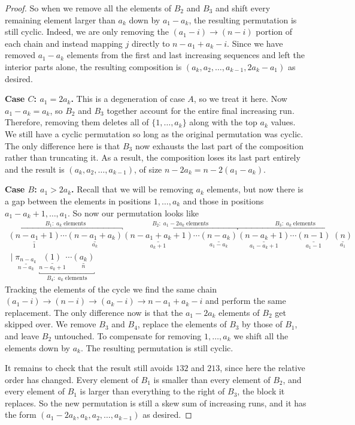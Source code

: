 \documentclass[10pt,a4paper]{amsart}
\begin{document}
\begin{proof}
    So when we remove all the elements of $B_2$ and $B_3$ and shift every remaining element larger than $a_k$ down by $a_1-a_k$, the resulting permutation is still cyclic. Indeed, we are only removing the $(a_1 - i) \to (n-i)$ portion of each chain and instead mapping $j$ directly to $n-a_1 + a_k - i$. Since we have removed $a_1-a_k$ elements from the first and last increasing sequences and left the interior parts alone, the resulting composition is $(a_k,a_2,\dots,a_{k-1},2a_k-a_1)$ as desired.

    \medskip
    \noindent\textbf{Case $C$: $a_1 = 2a_k$.} This is a degeneration of case $A$, so we treat it here. Now $a_1 - a_k = a_k$, so $B_2$ and $B_3$ together account for the entire final increasing run. Therefore, removing them deletes all of $\{1,\dots,a_k\}$ along with the top $a_k$ values. We still have a cyclic permutation so long as the original permutation was cyclic. The only difference here is that $B_3$ now exhausts the last part of the composition rather than truncating it. As a result, the composition loses its last part entirely and the result is $(a_k, a_2,\dots,a_{k-1})$, of size $n - 2a_k = n - 2(a_1-a_k)$.

    \medskip
    \noindent\textbf{Case $B$: $a_1 > 2a_k$.} Recall that we will be removing $a_k$ elements, but now there is a gap between the elements in positions $1,\dots,a_k$ and those in positions $a_1 - a_k + 1,\dots,a_1$. So now our permutation looks like
    \[
     \begin{gathered}
    \overbracket{\underset{1}{\underline{(n-a_1+1)}} \cdots \underset{a_k}{\underline{(n-a_1 + a_k)}}}^{B_1: \; a_k \; \text{elements}}  \overbracket{ \underset{a_k+1}{\underline{(n-a_1+a_k+1)}} \cdots\underset{a_1-a_k}{\underline{(n-a_k)}}}^{B_2: \; a_1-2a_k \; \text{elements}} \overbracket{\underset{a_1-a_k +1}{\underline{(n-a_k+1)}}\cdots \underset{a_1-1}{\underline{(n-1)}} \;\underset{a_1}{\underline{(n)}}}^{B_3: \; a_k \; \text{elements}} \\ 
     \; | \;\underset{n-a_k}{\underline{\pi_{n-a_k}}} \;\underbracket{\underset{n-a_k+1}{\underline{(1)}} \cdots \underset{n}{\underline{(a_k)}}}_{B_4: \; a_k \; \text{elements}}
    \end{gathered}
    \]
    Tracking the elements of the cycle we find the same chain $(a_1-i) \to (n-i) \to (a_k-i) \to n-a_1 + a_k - i$ and perform the same replacement. The only difference now is that the $a_1-2a_k$ elements of $B_2$ get skipped over. We remove $B_3$ and $B_4$, replace the elements of $B_3$ by those of $B_1$, and leave $B_2$ untouched. To compensate for removing $1,\dots,a_k$ we shift all the elements down by $a_k$. The resulting permutation is still cyclic.

    It remains to check that the result still avoids $132$ and $213$, since here the relative order has changed. Every element of $B_1$ is smaller than every element of $B_2$, and every element of $B_1$ is larger than everything to the right of $B_3$, the block it replaces. So the new permutation is still a skew sum of increasing runs, and it has the form $(a_1-2a_k,a_k,a_2,\dots,a_{k-1})$ as desired.
\end{proof}
\end{document}
